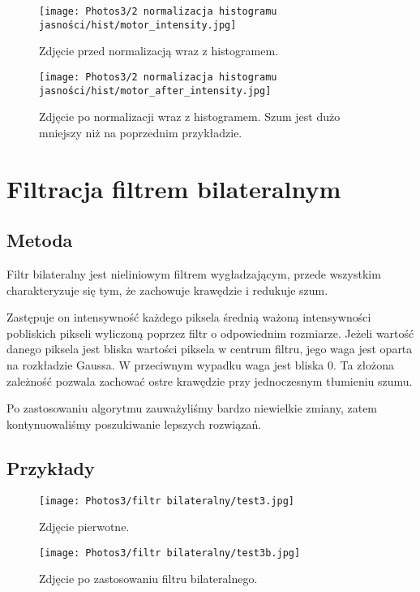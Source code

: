 \documentclass[]{mwart}
\begin{document}
\newpage

\begin{figure}[H]
    \centering
    \texttt{[image: Photos3/2 normalizacja histogramu jasności/hist/motor\_intensity.jpg]}
    \caption{Zdjęcie przed normalizacją wraz z histogramem.}
\end{figure}
\begin{figure}[H]
    \centering
    \texttt{[image: Photos3/2 normalizacja histogramu jasności/hist/motor\_after\_intensity.jpg]}
    \caption{Zdjęcie po normalizacji wraz z histogramem. Szum jest dużo mniejszy niż na poprzednim przykładzie.}
\end{figure}




\vfill
\section{Filtracja filtrem bilateralnym         }
\subsection{Metoda}
Filtr bilateralny jest nieliniowym filtrem wygładzającym, przede wszystkim charakteryzuje się tym,
że zachowuje krawędzie i redukuje szum.

Zastępuje on intensywność każdego piksela średnią ważoną intensywności pobliskich pikseli
wyliczoną poprzez filtr o odpowiednim rozmiarze.
Jeżeli wartość danego piksela jest bliska wartości piksela w centrum filtru, jego waga jest
oparta na rozkładzie Gaussa. W przeciwnym wypadku waga jest bliska 0.
Ta złożona zależność pozwala zachować ostre krawędzie przy jednoczesnym tłumieniu szumu.

Po zastosowaniu algorytmu zauważyliśmy bardzo niewielkie zmiany, zatem kontynuowaliśmy poszukiwanie lepszych rozwiązań.
\newpage


\subsection{Przykłady}

\begin{figure}[H]
    \centering
    \texttt{[image: Photos3/filtr bilateralny/test3.jpg]}
    \caption{Zdjęcie pierwotne.}
\end{figure} \newpage
\begin{figure}[H]
    \centering
    \texttt{[image: Photos3/filtr bilateralny/test3b.jpg]}
    \caption{Zdjęcie po zastosowaniu filtru bilateralnego.}
\end{figure}
\end{document}
